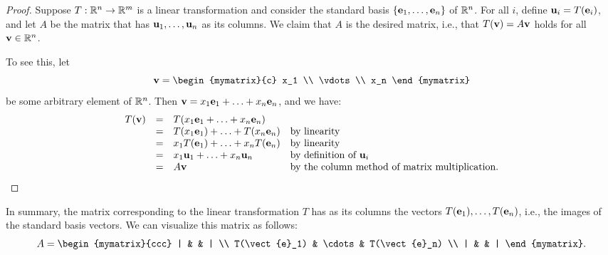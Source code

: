 \begin{proof}
  Suppose $T:\mathbb{R}^{n}\to \mathbb{R}^{m}$ is a linear transformation and consider
  the standard basis $\left\{\mbox{\bf e}_1,\ldots,\mbox{\bf e}_n\right\}$ of $\mathbb{R}^n$.
  For all $i$, define $\mbox{\bf u}_i = T(\mbox{\bf e}_i)$, and let $A$ be the
  matrix that has $\mbox{\bf u}_1,\ldots,\mbox{\bf u}_n$ as its columns. We
  claim that $A$ is the desired matrix, i.e., that
  $T(\mbox{\bf v}) = A\mbox{\bf v}$ holds for all $\mbox{\bf v}\in\mathbb{R}^n$.

  To see this, let
  \begin{equation*}
    \vect{v} =
    \begin{mymatrix}{c} x_1 \\ \vdots \\ x_n \end{mymatrix}
  \end{equation*}
  be some arbitrary element of $\mathbb{R}^n$. Then
  $\mbox{\bf v} = x_1\mbox{\bf e}_1 + \ldots + x_n\mbox{\bf e}_n$, and we have:
  \begin{equation*}
    \begin{array}{rcl@{\quad}l}
      T(\vect{v})
      &=& T(x_1\vect{e}_1 + \ldots + x_n\vect{e}_n)
      \\
      &=& T(x_1\vect{e}_1) + \ldots + T(x_n\vect{e}_n)
      & \mbox{by linearity}\\
      &=& x_1T(\vect{e}_1) + \ldots + x_nT(\vect{e}_n)
      & \mbox{by linearity}\\
      &=& x_1\vect{u}_1 + \ldots + x_n\vect{u}_n
      & \mbox{by definition of $\vect{u}_i$}\\
      &=& A\vect{v}
      & \mbox{by the column method of matrix multiplication.}
    \end{array}
  \end{equation*}
\end{proof}

In summary, the matrix corresponding to the linear transformation $T$
has as its columns the vectors $T(\mbox{\bf e}_1),\ldots,T(\mbox{\bf e}_n)$,
i.e., the images of the standard basis vectors. We can visualize this
matrix as follows:
\begin{equation*}
  A=
  \begin{mymatrix}{ccc}
    | &  & | \\
    T(\vect{e}_1) & \cdots & T(\vect{e}_n) \\
    | &  & |
  \end{mymatrix}.
\end{equation*}


